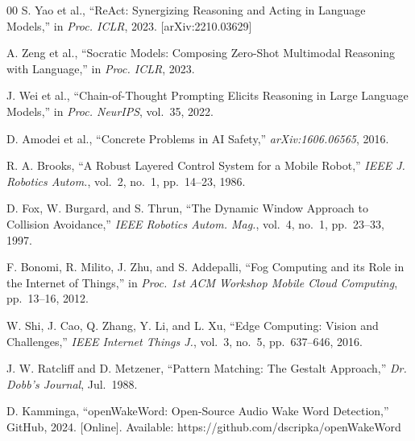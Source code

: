 \documentclass[conference]{IEEEtran}
\begin{document}
\begin{thebibliography}{00}
S. Yao et al.,
``ReAct: Synergizing Reasoning and Acting in Language Models,''
in \textit{Proc. ICLR}, 2023. [arXiv:2210.03629]

A. Zeng et al.,
``Socratic Models: Composing Zero-Shot Multimodal Reasoning with Language,''
in \textit{Proc. ICLR}, 2023.

J. Wei et al.,
``Chain-of-Thought Prompting Elicits Reasoning in Large Language Models,''
in \textit{Proc. NeurIPS}, vol.~35, 2022.

D. Amodei et al.,
``Concrete Problems in AI Safety,'' \textit{arXiv:1606.06565}, 2016.

R. A. Brooks,
``A Robust Layered Control System for a Mobile Robot,''
\textit{IEEE J. Robotics Autom.}, vol.~2, no.~1, pp.~14--23, 1986.

D. Fox, W. Burgard, and S. Thrun,
``The Dynamic Window Approach to Collision Avoidance,''
\textit{IEEE Robotics Autom. Mag.}, vol.~4, no.~1, pp.~23--33, 1997.

F. Bonomi, R. Milito, J. Zhu, and S. Addepalli,
``Fog Computing and its Role in the Internet of Things,''
in \textit{Proc. 1st ACM Workshop Mobile Cloud Computing}, pp.~13--16, 2012.

W. Shi, J. Cao, Q. Zhang, Y. Li, and L. Xu,
``Edge Computing: Vision and Challenges,''
\textit{IEEE Internet Things J.}, vol.~3, no.~5, pp.~637--646, 2016.

J. W. Ratcliff and D. Metzener,
``Pattern Matching: The Gestalt Approach,''
\textit{Dr. Dobb's Journal}, Jul.\ 1988.

D. Kamminga,
``openWakeWord: Open-Source Audio Wake Word Detection,''
GitHub, 2024. [Online]. Available: https://github.com/dscripka/openWakeWord

\end{thebibliography}
\end{document}
